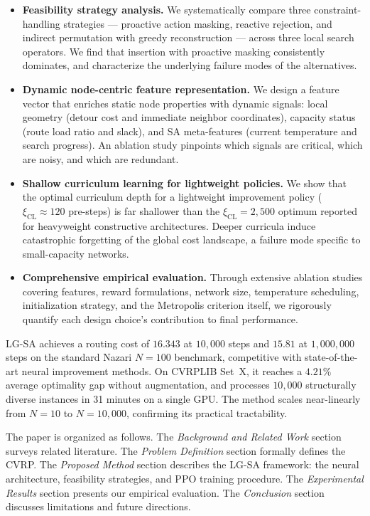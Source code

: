 \documentclass[letterpaper]{article} %
\begin{document}
\begin{itemize}
    \item \textbf{Feasibility strategy analysis.} We systematically compare three constraint-handling strategies --- proactive action masking, reactive rejection, and indirect permutation with greedy reconstruction --- across three local search operators. We find that insertion with proactive masking consistently dominates, and characterize the underlying failure modes of the alternatives.

    \item \textbf{Dynamic node-centric feature representation.} We design a feature vector that enriches static node properties with dynamic signals: local geometry (detour cost and immediate neighbor coordinates), capacity status (route load ratio and slack), and SA meta-features (current temperature and search progress). An ablation study pinpoints which signals are critical, which are noisy, and which are redundant.

    \item \textbf{Shallow curriculum learning for lightweight policies.} We show that the optimal curriculum depth for a lightweight improvement policy ($\xi_{\text{CL}} \approx 120$ pre-steps) is far shallower than the $\xi_{\text{CL}}=2{,}500$ optimum reported for heavyweight constructive architectures. Deeper curricula induce catastrophic forgetting of the global cost landscape, a failure mode specific to small-capacity networks.

    \item \textbf{Comprehensive empirical evaluation.} Through extensive ablation studies covering features, reward formulations, network size, temperature scheduling, initialization strategy, and the Metropolis criterion itself, we rigorously quantify each design choice's contribution to final performance.
\end{itemize}

LG-SA achieves a routing cost of $16.343$ at $10{,}000$ steps and $15.81$ at $1{,}000{,}000$ steps on the standard Nazari $N=100$ benchmark, competitive with state-of-the-art neural improvement methods. On CVRPLIB Set~X, it reaches a $4.21\%$ average optimality gap without augmentation, and processes $10{,}000$ structurally diverse instances in 31 minutes on a single GPU. The method scales near-linearly from $N=10$ to $N=10{,}000$, confirming its practical tractability.

The paper is organized as follows. The \textit{Background and Related Work} section surveys related literature. The \textit{Problem Definition} section formally defines the CVRP. The \textit{Proposed Method} section describes the LG-SA framework: the neural architecture, feasibility strategies, and PPO training procedure. The \textit{Experimental Results} section presents our empirical evaluation. The \textit{Conclusion} section discusses limitations and future directions.
\end{document}
